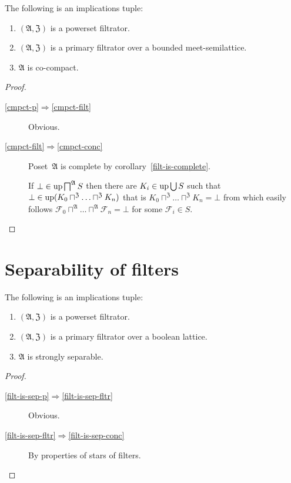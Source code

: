 \begin{thm}
The following is an implications tuple:
\begin{enumerate}
\item \label{cmpct-p}$(\mathfrak{A},\mathfrak{Z})$ is a powerset filtrator.
\item \label{cmpct-filt}$(\mathfrak{A},\mathfrak{Z})$ is a primary filtrator
over a bounded meet-semilattice.
\item \label{cmpct-conc}$\mathfrak{A}$ is co-compact.
\end{enumerate}
\end{thm}
\begin{proof}
~
\begin{description}
\item [{\ref{cmpct-p}$\Rightarrow$\ref{cmpct-filt}}] Obvious.
\item [{\ref{cmpct-filt}$\Rightarrow$\ref{cmpct-conc}}] Poset~$\mathfrak{A}$
is complete by corollary~\ref{filt-is-complete}.


If $\bot\in\operatorname{up}\bigsqcap^{\mathfrak{A}}S$ then there are $K_{i}\in\operatorname{up}\bigcup S$
such that $\bot\in\operatorname{up}(K_{0}\sqcap^{\mathfrak{Z}}\ldots\sqcap^{\mathfrak{Z}}K_{n})$
that is $K_{0}\sqcap^{\mathfrak{Z}}\ldots\sqcap^{\mathfrak{Z}}K_{n}=\bot$
from which easily follows $\mathcal{F}_{0}\sqcap^{\mathfrak{A}}\ldots\sqcap^{\mathfrak{A}}\mathcal{F}_{n}=\bot$
for some $\mathcal{F}_{i}\in S$.

\end{description}
\end{proof}

\section{Separability of filters}
\begin{prop}
\label{filt-is-sep}The following is an implications tuple:
\begin{enumerate}
\item \label{filt-is-sep-p}$(\mathfrak{A},\mathfrak{Z})$ is a powerset
filtrator.
\item \label{filt-is-sep-fltr}$(\mathfrak{A},\mathfrak{Z})$ is a primary
filtrator over a boolean lattice.
\item \label{filt-is-sep-conc}$\mathfrak{A}$ is strongly separable.
\end{enumerate}
\end{prop}
\begin{proof}
~
\begin{description}
\item [{\ref{filt-is-sep-p}$\Rightarrow$\ref{filt-is-sep-fltr}}] Obvious.
\item [{\ref{filt-is-sep-fltr}$\Rightarrow$\ref{filt-is-sep-conc}}] By
properties of stars of filters.
\end{description}
\end{proof}

